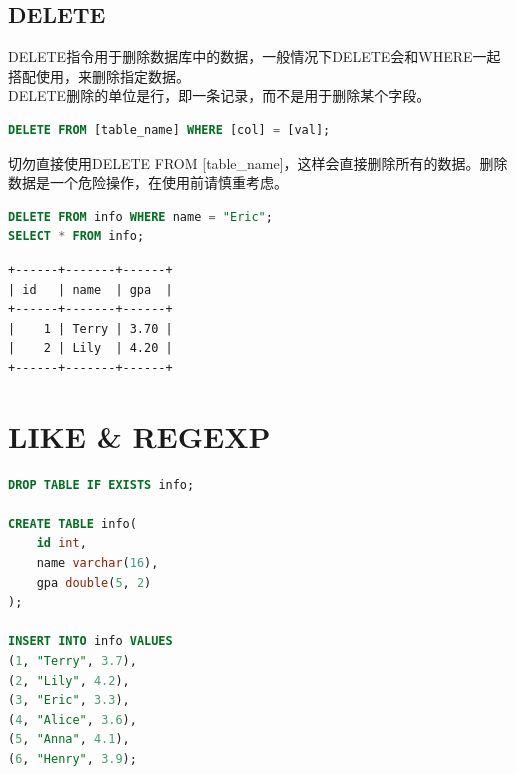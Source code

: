 \documentclass[12pt, openany, oneside]{book}
\begin{document}
\vspace{0.5cm}

\section{DELETE}

DELETE指令用于删除数据库中的数据，一般情况下DELETE会和WHERE一起搭配使用，来删除指定数据。\\

DELETE删除的单位是行，即一条记录，而不是用于删除某个字段。

\vspace{-0.5cm}

\begin{lstlisting}[language=SQL]
DELETE FROM [table_name] WHERE [col] = [val];
\end{lstlisting}

切勿直接使用DELETE FROM [table\_name]，这样会直接删除所有的数据。删除数据是一个危险操作，在使用前请慎重考虑。\\


\begin{lstlisting}[language=SQL]
DELETE FROM info WHERE name = "Eric";
SELECT * FROM info;
\end{lstlisting}

\begin{tcolorbox}
	\begin{verbatim}
+------+-------+------+
| id   | name  | gpa  |
+------+-------+------+
|    1 | Terry | 3.70 |
|    2 | Lily  | 4.20 |
+------+-------+------+
\end{verbatim}
\end{tcolorbox}

\newpage

\chapter{LIKE \& REGEXP}

\vspace{0.5cm}


\begin{lstlisting}[language=SQL]
DROP TABLE IF EXISTS info;

CREATE TABLE info(
    id int,
    name varchar(16),
    gpa double(5, 2)
);

INSERT INTO info VALUES
(1, "Terry", 3.7),
(2, "Lily", 4.2),
(3, "Eric", 3.3),
(4, "Alice", 3.6),
(5, "Anna", 4.1),
(6, "Henry", 3.9);
\end{lstlisting}
\end{document}
